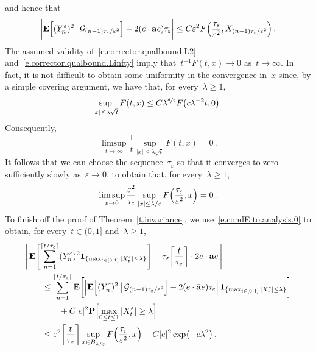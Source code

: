 \documentclass[11pt,twoside]{article} %
\numberwithin{equation}{section}
\theoremstyle{definition}
\newcommand{\eps}{\varepsilon}
\newcommand{\ep}{\eps}
\renewcommand{\a}{\mathbf{a}}
\newcommand{\ahom}{\bar{\a}}
\newcommand{\indc}{\boldsymbol{1}}
\begin{document}
and hence that
\begin{equation}
\label{e.condE.to.analysis.0}
\biggl| 
\mathbf{E} \Bigl[ (Y_{n}^\ep )^2 \, \big\vert \, \mathcal{G}_{(n-1)\tau_\ep/\ep^2} \Bigr] 
- 2 (e\cdot \a e) \tau_\ep
\biggr|
\leq
C\ep^2 F\Bigl( \frac{\tau_\ep} {\ep^2} , X_{(n-1)\tau_\ep/\ep^2}\Bigr)
\,.
\end{equation}
The assumed validity of~\eqref{e.corrector.qualbound.L2} and~\eqref{e.corrector.qualbound.Linfty} imply that~$t^{-1} F(t,x) \to 0$ as~$t\to \infty$. In fact, it is not difficult to obtain some uniformity in the convergence in~$x$ since, by a simple covering argument, we have that, for every~$\lambda\geq 1$, 
\begin{equation*}
\sup_{|x| \leq \lambda \sqrt{t} } F(t,x) 
\leq 
C\lambda^{\nicefrac d2} F\bigl( c\lambda^{-2}t,0 \bigr)
\,.
\end{equation*}
Consequently,
\begin{equation*}
\limsup_{ t \to \infty}
\frac 1t 
\sup_{|x| \leq \lambda \sqrt{t} }
F (t, x)
= 0
\,.
\end{equation*}
It follows that we can choose the sequence~$\tau_\ep$ so that it converges to zero sufficiently slowly as~$\ep \to 0$, to obtain that, for every~$\lambda\geq 1$, 
\begin{equation}
\label{e.F.uniform.trap.tauep}
\limsup_{ \ep \to 0}
\frac{\ep^2}{\tau_\ep}
\sup_{ |x| \leq \lambda/\ep}
F \Bigl( \frac {\tau_\ep}{\ep^2}, x \Bigr)
= 0
\,.
\end{equation}
To finish off the proof of Theorem~\ref{t.invariance}, we use~\eqref{e.condE.to.analysis.0} to obtain, for every~$t \in (0,1]$ and~$\lambda\geq 1$,
\begin{align}
\label{e.Yepn2.main}
\lefteqn{
\Biggl|
\,
\mathbf{E} 
\Biggl[ 
\sum_{n=1}^{\lceil t/\tau_\ep \rceil} 
(Y^\ep_n)^2\indc_{\{ \max_{ t\in[0,1]} |X^\ep_{t} | \leq \lambda\}}
\Biggr]
-
\tau_\ep \biggl\lceil \frac{t}{\tau_\ep} \biggr\rceil  \cdot 2 e\cdot \ahom e
\,
\Biggr|
} 
\qquad &
\notag \\ &
\leq
\sum_{n=1}^{\lceil t/\tau_\ep \rceil}
\mathbf{E} \biggl[
\Bigl| 
\mathbf{E} \Bigl[ (Y_{n}^\ep )^2 \, \big\vert \, \mathcal{G}_{(n-1)\tau_\ep/\ep^2} \Bigr] 
- 2 (e\cdot \ahom e) \tau_\ep
\Bigr|
\, \indc_{\{ \max_{  t\in[0,1]} |X^\ep_{t} | \leq \lambda \}} 
\biggr]
\notag \\ & \qquad 
+
C|e|^2 \mathbf{P} \Bigl[ \max_{ 0 \leq t \leq 1} |X^\ep_{t} | \geq \lambda \Bigr]
\notag \\ & 
\leq
\ep^2 \biggl\lceil \frac{t}{\tau_\ep} \biggr\rceil 
\sup_{ x \in B_{\lambda /\ep}}
F \Bigl( \frac {\tau_\ep}{\ep^2}, x \Bigr)
+
C|e|^2 \exp \bigl(-c\lambda^2\bigr)
\,.
\end{align}
\end{document}

